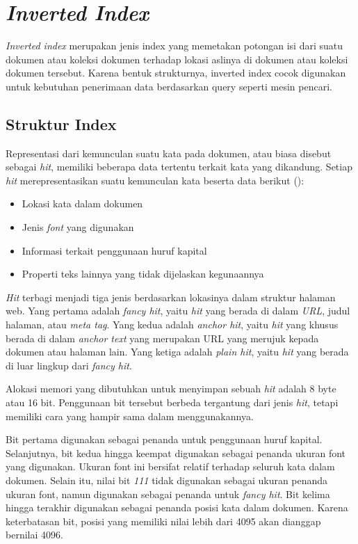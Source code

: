 \section{\emph{Inverted Index}}

\emph{Inverted index} merupakan jenis index yang memetakan potongan isi dari
suatu dokumen atau koleksi dokumen terhadap lokasi aslinya di dokumen atau
koleksi dokumen tersebut. Karena bentuk strukturnya, inverted index cocok
digunakan untuk kebutuhan penerimaan data berdasarkan query seperti mesin
pencari.

\subsection{Struktur Index}

Representasi dari kemunculan suatu kata pada dokumen, atau biasa disebut sebagai
\emph{hit}, memiliki beberapa data tertentu terkait kata yang dikandung. Setiap
\emph{hit} merepresentasikan suatu kemunculan kata beserta data berikut 
(\cite{brin1998google}):

\begin{itemize}
  \item{Lokasi kata dalam dokumen}
  \item{Jenis \emph{font} yang digunakan}
  \item{Informasi terkait penggunaan huruf kapital}
  \item{Properti teks lainnya yang tidak dijelaskan kegunaannya}
\end{itemize}

\emph{Hit} terbagi menjadi tiga jenis berdasarkan lokasinya dalam struktur
halaman web. Yang pertama adalah \emph{fancy hit}, yaitu \emph{hit} yang berada
di dalam \emph{URL}, judul halaman, atau \emph{meta tag}. Yang kedua adalah
\emph{anchor hit}, yaitu \emph{hit} yang khusus berada di dalam
\emph{anchor text} yang merupakan URL yang merujuk kepada dokumen atau halaman
lain. Yang ketiga adalah \emph{plain hit}, yaitu \emph{hit} yang berada di luar
lingkup dari \emph{fancy hit}.

Alokasi memori yang dibutuhkan untuk menyimpan sebuah \emph{hit} adalah 8 byte
atau 16 bit. Penggunaan bit tersebut berbeda tergantung dari jenis \emph{hit},
tetapi memiliki cara yang hampir sama dalam menggunakannya. 

Bit pertama digunakan sebagai penanda untuk penggunaan huruf kapital.
Selanjutnya, bit kedua hingga keempat digunakan sebagai penanda ukuran font yang
digunakan. Ukuran font ini bersifat relatif terhadap seluruh kata dalam dokumen.
Selain itu, nilai bit \emph{111} tidak digunakan sebagai ukuran penanda ukuran
font, namun digunakan sebagai penanda untuk \emph{fancy hit}. Bit kelima hingga
terakhir digunakan sebagai penanda posisi kata dalam dokumen. Karena
keterbatasan bit, posisi yang memiliki nilai lebih dari 4095 akan dianggap
bernilai 4096.

